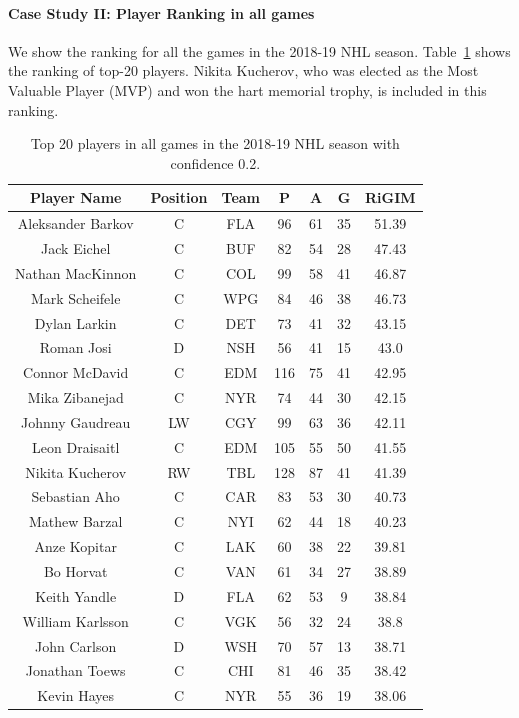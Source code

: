 \documentclass{article}
\newcommand{\sys}{RiGIM}
\begin{document}
\paragraph{Case Study II: Player Ranking in all games}

We show the ranking for all the games in the 2018-19 NHL season. Table~\ref{table:player-ranking-all-0.2} shows the ranking of top-20 players. Nikita Kucherov, who was elected as the Most Valuable Player (MVP) and won the hart memorial trophy, is included in this ranking.
\begin{table}[htbp]
\centering
\caption{Top 20 players in all games in the 2018-19 NHL season with confidence 0.2.}
\label{table:player-ranking-all-0.2}
\begin{tabular}{ccccccc}
\toprule
Player Name  & Position & Team  & P & A & G & \sys \\ \hline
Aleksander Barkov & C & FLA & 96 & 61 & 35 & 51.39\\ 
Jack Eichel & C & BUF & 82 & 54 & 28 & 47.43\\ 
Nathan MacKinnon & C & COL & 99 & 58 & 41 & 46.87\\ 
Mark Scheifele & C & WPG & 84 & 46 & 38 & 46.73\\ 
Dylan Larkin & C & DET & 73 & 41 & 32 & 43.15\\ 
Roman Josi & D & NSH & 56 & 41 & 15 & 43.0\\ 
Connor McDavid & C & EDM & 116 & 75 & 41 & 42.95\\ 
Mika Zibanejad & C & NYR & 74 & 44 & 30 & 42.15\\ 
Johnny Gaudreau & LW & CGY & 99 & 63 & 36 & 42.11\\ 
Leon Draisaitl & C & EDM & 105 & 55 & 50 & 41.55\\ 
Nikita Kucherov & RW & TBL & 128 & 87 & 41 & 41.39\\ 
Sebastian Aho & C & CAR & 83 & 53 & 30 & 40.73\\ 
Mathew Barzal & C & NYI & 62 & 44 & 18 & 40.23\\ 
Anze Kopitar & C & LAK & 60 & 38 & 22 & 39.81\\ 
Bo Horvat & C & VAN & 61 & 34 & 27 & 38.89\\ 
Keith Yandle & D & FLA & 62 & 53 & 9 & 38.84\\ 
William Karlsson & C & VGK & 56 & 32 & 24 & 38.8\\ 
John Carlson & D & WSH & 70 & 57 & 13 & 38.71\\ 
Jonathan Toews & C & CHI & 81 & 46 & 35 & 38.42\\ 
Kevin Hayes & C & NYR & 55 & 36 & 19 & 38.06\\ 
\bottomrule
\end{tabular}
\end{table}
\end{document}

